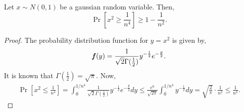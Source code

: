 \begin{lemma}\label{lem:chi}
Let $x\sim N(0,1)$ be a gaussian random variable. Then,
\[
\Pr\left[x^2\geq \frac{1}{n^4}\right] \geq 1- \frac{1}{n^{2}}.
\]
\end{lemma}
\begin{proof}
The probability distribution function for $y = x^2$ is given by,
\[
\boldsymbol{\mathit{f}}(y) = \frac{1}{\sqrt{2}\Gamma(\frac{1}{2})}y^{-\frac{1}{2}}e^{-\frac{y}{2}}.
\]
It is known that $\Gamma(\frac{1}{2}) = \sqrt{\pi}$. Now, 
\begin{align*}
\Pr\left[x^2\leq \frac{1}{n^4}\right] =  \int_{0}^{1/n^4}\frac{1}{\sqrt{2}\Gamma(\frac{1}{2})}y^{-\frac{1}{2}}e^{-\frac{y}{2}}dy
\leq  \frac{e^0}{\sqrt{2\pi}} \int_{0}^{1/n^4} y^{-\frac{1}{2}}dy
=  \sqrt{\frac{2}{\pi}} \cdot \frac{1}{n^{2}}
\leq  \frac{1}{n^{2}}.
\end{align*}
\end{proof}


